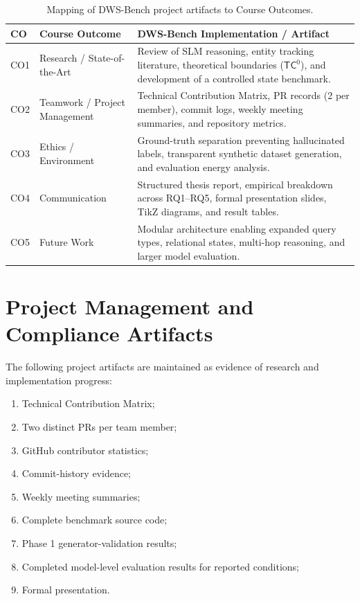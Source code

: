 \documentclass{iutbscthesis}
\begin{document}
\begin{table}[H]
\centering
\small
\renewcommand{\arraystretch}{1.25}
\begin{tabular}{p{}p{}p{}}
\toprule
\textbf{CO} & \textbf{Course Outcome} & \textbf{DWS-Bench Implementation / Artifact} \\
\midrule
CO1 & Research / State-of-the-Art & Review of SLM reasoning, entity tracking literature, theoretical boundaries ($\mathsf{TC}^0$), and development of a controlled state benchmark. \\
CO2 & Teamwork / Project Management & Technical Contribution Matrix, PR records (2 per member), commit logs, weekly meeting summaries, and repository metrics. \\
CO3 & Ethics / Environment & Ground-truth separation preventing hallucinated labels, transparent synthetic dataset generation, and evaluation energy analysis. \\
CO4 & Communication & Structured thesis report, empirical breakdown across RQ1--RQ5, formal presentation slides, TikZ diagrams, and result tables. \\
CO5 & Future Work & Modular architecture enabling expanded query types, relational states, multi-hop reasoning, and larger model evaluation. \\
\bottomrule
\end{tabular}
\caption{Mapping of DWS-Bench project artifacts to Course Outcomes.}
\label{tab:co-mapping}
\end{table}

\section{Project Management and Compliance Artifacts}
The following project artifacts are maintained as evidence of research and implementation progress:
\begin{enumerate}[noitemsep]
    \item Technical Contribution Matrix;
    \item Two distinct PRs per team member;
    \item GitHub contributor statistics;
    \item Commit-history evidence;
    \item Weekly meeting summaries;
    \item Complete benchmark source code;
    \item Phase 1 generator-validation results;
    \item Completed model-level evaluation results for reported conditions;
    \item Formal presentation.
\end{enumerate}
\end{document}

